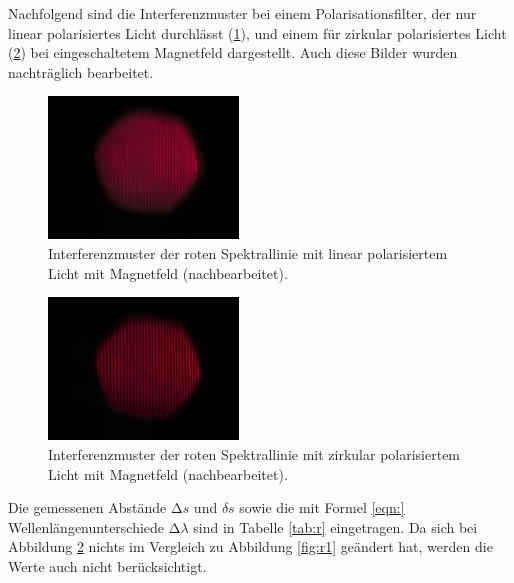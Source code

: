 Nachfolgend sind die Interferenzmuster bei einem Polarisationsfilter, der nur linear polarisiertes Licht durchlässt (\ref{fig:r2}), und einem für zirkular polarisiertes Licht (\ref{fig:r3}) 
bei eingeschaltetem Magnetfeld dargestellt. Auch diese Bilder wurden nachträglich bearbeitet.

\FloatBarrier
\begin{figure}
  \centering
  \includegraphics[width=0.45\textwidth]{IMG_0104k.jpg}
  \caption{Interferenzmuster der roten Spektrallinie mit linear polarisiertem Licht mit Magnetfeld (nachbearbeitet).}
  \label{fig:r2}
\end{figure}
\FloatBarrier
\FloatBarrier
\begin{figure}
  \centering
  \includegraphics[width=0.45\textwidth]{IMG_0105k.jpg}
  \caption{Interferenzmuster der roten Spektrallinie mit zirkular polarisiertem Licht mit Magnetfeld (nachbearbeitet).}
  \label{fig:r3}
\end{figure}
\FloatBarrier

Die gemessenen Abstände $\increment s$ und  $\delta s$ sowie die mit Formel
\ref{eqn:} %
Wellenlängenunterschiede $\increment \lambda$ sind in Tabelle \ref{tab:r} eingetragen. Da sich bei Abbildung \ref{fig:r3}
nichts im Vergleich zu Abbildung \ref{fig:r1} geändert hat, werden die Werte auch nicht berücksichtigt. 

